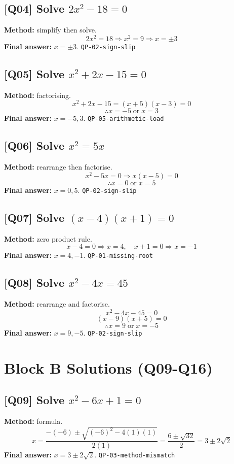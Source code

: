 \documentclass[11pt,a4paper]{article}
\newcommand{\QID}[1]{\textcolor{MPrimary}{\textbf{[#1]}}}
\newcommand{\Tag}[1]{\textcolor{MMuted}{\texttt{#1}}}
\begin{document}
\subsection*{\QID{Q04} Solve \(2x^2-18=0\)}
\textbf{Method:} simplify then solve.
\[
2x^2=18 \Rightarrow x^2=9 \Rightarrow x=\pm3
\]
\textbf{Final answer:} \(x=\pm3\). \Tag{QP-02-sign-slip}

\subsection*{\QID{Q05} Solve \(x^2+2x-15=0\)}
\textbf{Method:} factorising.
\[
x^2+2x-15=(x+5)(x-3)=0
\]
\[
\therefore x=-5\;\text{or}\;x=3
\]
\textbf{Final answer:} \(x=-5,3\). \Tag{QP-05-arithmetic-load}

\subsection*{\QID{Q06} Solve \(x^2=5x\)}
\textbf{Method:} rearrange then factorise.
\[
x^2-5x=0 \Rightarrow x(x-5)=0
\]
\[
\therefore x=0\;\text{or}\;x=5
\]
\textbf{Final answer:} \(x=0,5\). \Tag{QP-02-sign-slip}

\subsection*{\QID{Q07} Solve \((x-4)(x+1)=0\)}
\textbf{Method:} zero product rule.
\[
x-4=0\Rightarrow x=4,\quad x+1=0\Rightarrow x=-1
\]
\textbf{Final answer:} \(x=4,-1\). \Tag{QP-01-missing-root}

\subsection*{\QID{Q08} Solve \(x^2-4x=45\)}
\textbf{Method:} rearrange and factorise.
\[
x^2-4x-45=0
\]
\[
(x-9)(x+5)=0
\]
\[
\therefore x=9\;\text{or}\;x=-5
\]
\textbf{Final answer:} \(x=9,-5\). \Tag{QP-02-sign-slip}

\section{Block B Solutions (Q09-Q16)}

\subsection*{\QID{Q09} Solve \(x^2-6x+1=0\)}
\textbf{Method:} formula.
\[
x=\frac{-(-6)\pm\sqrt{(-6)^2-4(1)(1)}}{2(1)}=\frac{6\pm\sqrt{32}}{2}=3\pm2\sqrt2
\]
\textbf{Final answer:} \(x=3\pm2\sqrt2\). \Tag{QP-03-method-mismatch}
\end{document}
